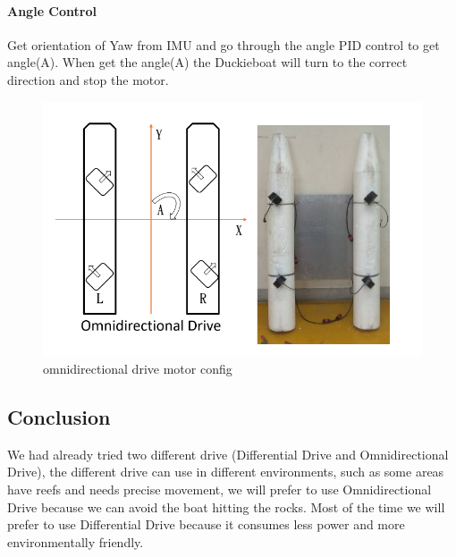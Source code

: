 \paragraph{Angle Control}

Get orientation of Yaw from IMU and go through the angle PID control to get angle(A). When get the angle(A) the Duckieboat will turn to the correct direction and stop the motor.

\begin{figure}[h]
	\includegraphics[width=1\columnwidth]{images/omni_drive.png}
	\centering
	\caption{omnidirectional drive motor config}
	\label{figure:omni_drive}
\end{figure}

\subsection{Conclusion}
We had already tried two different drive (Differential Drive and Omnidirectional Drive), the different drive can use in different environments, such as some areas have reefs and needs precise movement, we will prefer to use Omnidirectional Drive because we can avoid the boat hitting the rocks. Most of the time we will prefer to use Differential Drive because it consumes less power and more environmentally friendly.

